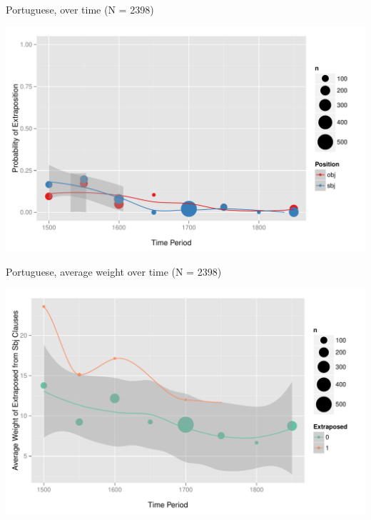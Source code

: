 \documentclass[hyperref={pdfpagelabels=false}]{beamer}
\begin{document}
\begin{frame}{Portuguese, over time (N = 2398)}

\begin{center}
\includegraphics[width=1.1\textwidth]{exSbjObjYearBinned50Loessport.pdf}
\end{center}
\end{frame}


\begin{frame}{Portuguese, average weight over time (N = 2398)}

\begin{center}
\includegraphics[width=1.1\textwidth]{exWeightYearBinned50Loessport.pdf}
\end{center}
\end{frame}



\end{document}
